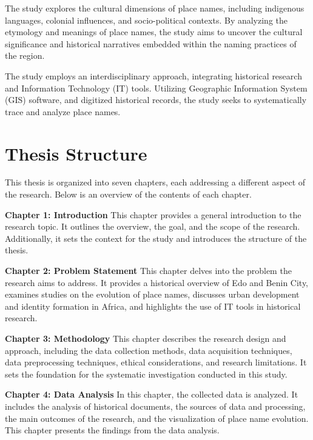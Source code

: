 The study explores the cultural dimensions of place names, including indigenous languages, colonial influences, and socio-political contexts. By analyzing the etymology and meanings of place names, the study aims to uncover the cultural significance and historical narratives embedded within the naming practices of the region.


The study employs an interdisciplinary approach, integrating historical research and Information Technology (IT) tools. Utilizing Geographic Information System (GIS) software, and digitized historical records, the study seeks to systematically trace and analyze place names.

\section{Thesis Structure}
This thesis is organized into seven chapters, each addressing a different aspect of the research. Below is an overview of the contents of each chapter.

\textbf{Chapter 1: Introduction}\newline
This chapter provides a general introduction to the research topic. It outlines the overview, the goal, and the scope of the research. Additionally, it sets the context for the study and introduces the structure of the thesis.

\textbf{Chapter 2: Problem Statement}\newline
This chapter delves into the problem the research aims to address. It provides a historical overview of Edo and Benin City, examines studies on the evolution of place names, discusses urban development and identity formation in Africa, and highlights the use of IT tools in historical research.

\textbf{Chapter 3: Methodology}\newline
This chapter describes the research design and approach, including the data collection methods, data acquisition techniques, data preprocessing techniques, ethical considerations, and research limitations. It sets the foundation for the systematic investigation conducted in this study.

\textbf{Chapter 4: Data Analysis}\newline
In this chapter, the collected data is analyzed. It includes the analysis of historical documents, the sources of data and processing, the main outcomes of the research, and the visualization of place name evolution. This chapter presents the findings from the data analysis.

